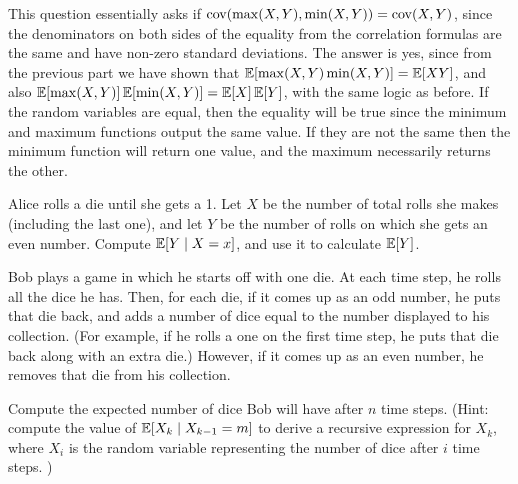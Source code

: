 \documentclass[11pt]{article}
\begin{document}
\begin{solution}
\begin{Parts}
\Part This question essentially asks if $\operatorname{cov}(\max(X, Y), \min(X, Y)) = \operatorname{cov}(X, Y)$,
since the denominators on both sides of the equality from the correlation 
formulas are the same and have non-zero standard deviations. The answer is yes, 
since from the previous part we have shown that $\operatorname{\mathbb{E}}[\max (X, Y) \min (X, Y)] = 
\operatorname{\mathbb{E}}[XY]$, and also $\operatorname{\mathbb{E}}[\max(X,Y)]\operatorname{\mathbb{E}}[\min(X,Y)] = \operatorname{\mathbb{E}}[X]\operatorname{\mathbb{E}}[Y]$, with the same logic
as before. If the random variables are equal, then the equality will be true since
the minimum and maximum functions output the same value. If they are not the same
then the minimum function will return one value, and the maximum necessarily
returns the other. 

\end{Parts}
	
\end{solution}


\begin{Parts}

\Part Alice rolls a die until she gets a 1. Let $X$ be the number of total rolls 
she makes (including the last one), and let $Y$ be the number of rolls on which 
she gets an even number. Compute $\operatorname{\mathbb{E}}[Y \mid X = x]$, and use it to calculate 
$\operatorname{\mathbb{E}}[Y]$. 

\Part Bob plays a game in which he starts off with one die. At each time step, 
he rolls all the dice he has. Then, for each die, if it comes up as an odd 
number, he puts that die back, and adds a number of dice equal to the number 
displayed to his collection. (For example, if he rolls a one on the first time 
step, he puts that die back along with an extra die.) However, if it comes up 
as an even number, he removes that die from his collection.

Compute the expected number of dice Bob will have after $n$ time steps. (Hint: 
compute the value of $\operatorname{\mathbb{E}}[X_k \mid X_{k-1} = m]$ to derive a recursive expression 
for $X_k$, where $X_i$ is the random variable representing the number of dice 
after $i$ time steps. )

\end{Parts}
\end{document}
